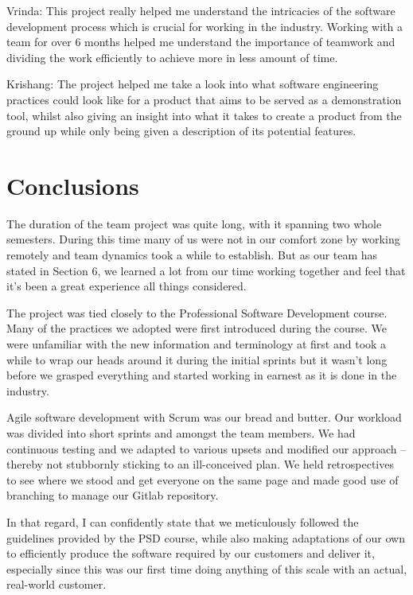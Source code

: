\documentclass{l3proj}
\begin{document}
Vrinda: This project really helped me understand the intricacies of the software development process which is crucial for working in the industry. Working with a team for over 6 months helped me understand the importance of teamwork and dividing the work efficiently to achieve more in less amount of time.

Krishang: The project helped me take a look into what software engineering practices could look like for a product that aims to be served as a demonstration tool, whilst also giving an insight into what it takes to create a product from the ground up while only being given a description of its potential features.



\section{Conclusions}

The duration of the team project was quite long, with it spanning two whole semesters. During this time many of us were not in our comfort zone by working remotely and team dynamics took a while to establish. But as our team has stated in Section 6, we learned a lot from our time working together and feel that it’s been a great experience all things considered.

The project was tied closely to the Professional Software Development course\cite{psd}. Many of the practices we adopted were first introduced during the course. We were unfamiliar with the new information and terminology at first and took a while to wrap our heads around it during the initial sprints but it wasn’t long before we grasped everything and started working in earnest as it is done in the industry.

Agile software development with Scrum was our bread and butter. Our workload was divided into short sprints and amongst the team members. We had continuous testing and we adapted to various upsets and modified our approach – thereby not stubbornly sticking to an ill-conceived plan. We held retrospectives to see where we stood and get everyone on the same page and made good use of branching to manage our Gitlab repository.

In that regard, I can confidently state that we meticulously followed the guidelines provided by the PSD course, while also making adaptations of our own to efficiently produce the software required by our customers and deliver it, especially since this was our first time doing anything of this scale with an actual, real-world customer.
\end{document}
